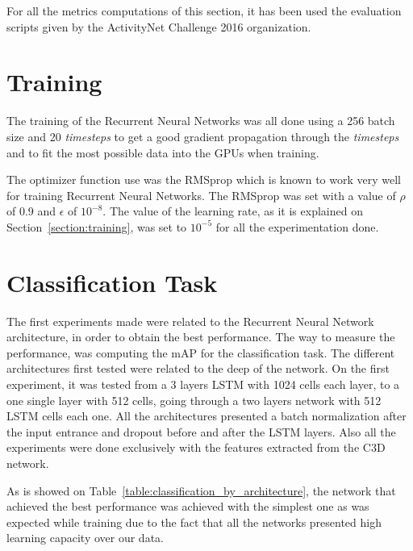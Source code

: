 For all the metrics computations of this section, it has been used the evaluation scripts given by the ActivityNet Challenge 2016 organization.

\section{Training}

The training of the Recurrent Neural Networks was all done using a 256 batch size and 20 \textit{timesteps} to get a good gradient propagation through the \textit{timesteps} and to fit the most possible data into the GPUs when training.

The optimizer function use was the RMSprop\cite{dauphin2015rmsprop} which is known to work very well for training Recurrent Neural Networks. The RMSprop was set with a value of $\rho$ of 0.9 and $\epsilon$ of $10^{-8}$. The value of the learning rate, as it is explained on Section~\ref{section:training}, was set to $10^{-5}$ for all the experimentation done. 


\section{Classification Task}

The first experiments made were related to the Recurrent Neural Network architecture, in order to obtain the best performance. The way to measure the performance, was computing the mAP for the classification task. The different architectures first tested were related to the deep of the network. On the first experiment, it was tested from a 3 layers LSTM with 1024 cells each layer, to a one single layer with 512 cells, going through a two layers network with 512 LSTM cells each one. All the architectures presented a batch normalization after the input entrance and dropout before and after the LSTM layers. Also all the experiments were done exclusively with the features extracted from the C3D network.

As is showed on Table~\ref{table:classification_by_architecture}, the network that achieved the best performance was achieved with the simplest one as was expected while training due to the fact that all the networks presented high learning capacity over our data.

